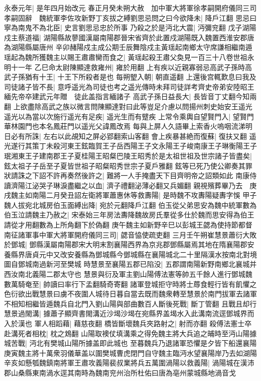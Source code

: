 永泰元年|{
	是年四月始改元}
春正月癸未朔大赦　加中軍大將軍徐孝嗣開府儀同三司孝嗣固辭　魏統軍李佐攻新野丁亥拔之縛劉思忌問之曰今欲降未|{
	降戶江翻}
思忌曰寧為南鬼不為北臣|{
	史言劉思忌忠於所事}
乃殺之於是沔北大震|{
	沔彌兖翻}
戊子湖陽戍主蔡道福|{
	湖陽縣故蓼國漢屬南陽郡晉宋省齊於此置戍湖陽既入魏置西淮安郡唐為湖陽縣屬唐州}
辛卯赭陽戍主成公期壬辰舞陰戍主黃瑶起南鄉太守席謙相繼南遁瑶起為魏所獲魏主以賜王肅肅臠而食之|{
	黃瑶起殺王肅父奐見一百三十八卷世祖永明十一年}
乙巳命太尉陳顯達救雍州|{
	雍於用翻}
上有疾以近親寡弱忌高武子孫時高武子孫猶有十王|{
	十王下所殺者是也}
每朔朢入朝|{
	朝直遥翻}
上還後宫輒歎息曰我及司徒諸子皆不長|{
	意呼遥光為司徒也考之遥光傳時未拜司徒詳考齊史帝弟安陸昭王緬先帝卒建武元年贈　徒此盖指言緬諸子}
高武子孫日益長大|{
	長皆音丁丈翻今知兩翻}
上欲盡除高武之族以微言問陳顯達對曰此等豈足介慮以問揚州刺史始安王遥光遥光以為當以次施行遥光有足疾|{
	遥光生而有躄疾}
上常令乘輿自望賢門入|{
	望賢門華林園門也本名鳳莊門以遥光父諱鳳改焉}
每與上屏人久語畢上索香火嗚咽流涕明日必有所誅|{
	左右以此覘知之屏必郢翻索山客翻}
會上疾暴甚絶而復蘇|{
	復扶又翻}
遥光遂行其策丁未殺河東王鉉臨賀王子岳西陽王子文永陽王子峻南康王子琳衡陽王子珉湘東王子建南郡王子夏桂陽王昭粲巴陵王昭秀於是太祖世祖及世宗諸子皆盡矣|{
	鉉太祖子子岳至子夏皆世祖子昭粲昭秀世宗子夏戶雅翻}
鉉等已死乃使公卿奏其罪狀請誅之下詔不許再奏然後許之|{
	難將一人手掩盡天下目齊明帝之詔類如此}
南康侍讀濟陽江泌哭子琳淚盡繼之以血|{
	濟子禮翻泌薄必翻又兵媚翻}
親視殯葬畢乃去　庚戌魏主如南陽二月癸丑詔左衛將軍蕭惠休等救夀陽|{
	是時魏不攻夀陽疑夀字悞}
甲子魏人拔宛北城房伯玉面縛出降|{
	宛於元翻降戶江翻}
伯玉從父弟思安為魏中統軍數為伯玉泣請魏主乃赦之|{
	宋泰始三年房法夀降魏故房氏羣從多仕於魏而思安得為伯王請從才用翻數為上所角翻下於偽翻}
庚午魏主如新野辛巳以彭城王勰為使持節都督南征諸軍事中軍大將軍開府儀同三司|{
	勰音恊使疏吏翻}
三月壬午朔崔慧景蕭衍大敗於鄧城|{
	鄧縣漢屬南陽郡宋大明末割襄陽西界為京兆郡鄧縣屬焉其地在隋襄陽郡安養縣界唐貞元中又改安養縣為鄧城縣今鄧城縣在襄陽城北二十里隔漢水按南北對境圖自鄧城南過新河至樊城}
時慧景至襄陽五郡已陷没|{
	五郡謂南陽新野南鄉北襄城并西汝南北義陽二郡太守也}
慧景與衍及軍主劉山陽傅法憲等帥五千餘人進行鄧城魏數萬騎奄至|{
	帥讀曰率行下孟翻騎奇寄翻}
諸軍登城拒守時將士蓐食輕行皆有飢懼之色衍欲出戰慧景曰虜不夜圍人城待日暮自當去既而魏衆轉至慧景於南門拔軍去諸軍不相知相繼皆遁魏兵自北門入劉山陽與部曲數百人斷後死戰|{
	斷丁管翻}
且戰且却行慧景過閙溝|{
	據蕭子顯齊書閙溝近沙堨沙堨在宛縣界盖堨水入此溝南流逕鄧城界而入於漢也}
軍人相蹈藉|{
	藉慈夜翻}
橋皆斷壞魏兵夾路射之|{
	射而亦翻}
殺傅法憲士卒赴溝死者相枕|{
	枕之鴆翻}
山陽取襖仗填溝乘之得免魏主將大兵追之晡時至沔山陽據城苦戰|{
	沔北有樊城山陽所據盖即此城也}
至暮魏兵乃退諸軍恐懼是夕皆下船還襄陽庚寅魏主將十萬衆羽儀華盖以圍樊城曹虎閉門自守魏主臨沔水望襄陽岸乃去如湖陽辛亥如懸瓠魏鎮南將軍王肅攻義陽裴叔業將兵五萬圍渦陽以救義陽|{
	渦陽城在漢沛郡山桑縣東南渦水逕其南時為魏南兖州治所杜佑曰唐為亳州蒙城縣地渦音戈}
